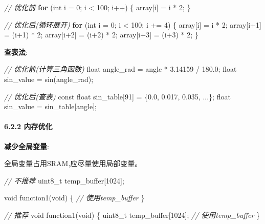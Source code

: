 \documentclass[
]{article}
\newenvironment{Shaded}{}{}
\newcommand{\CommentTok}[1]{\textcolor[rgb]{0.38,0.63,0.69}{\textit{#1}}}
\newcommand{\ControlFlowTok}[1]{\textcolor[rgb]{0.00,0.44,0.13}{\textbf{#1}}}
\newcommand{\DataTypeTok}[1]{\textcolor[rgb]{0.56,0.13,0.00}{#1}}
\newcommand{\DecValTok}[1]{\textcolor[rgb]{0.25,0.63,0.44}{#1}}
\newcommand{\FloatTok}[1]{\textcolor[rgb]{0.25,0.63,0.44}{#1}}
\newcommand{\NormalTok}[1]{#1}
\begin{document}
\begin{Shaded}
\begin{Highlighting}[]
\CommentTok{// 优化前}
\ControlFlowTok{for}\NormalTok{ (}\DataTypeTok{int}\NormalTok{ i = }\DecValTok{0}\NormalTok{; i \textless{} }\DecValTok{100}\NormalTok{; i++) \{}
\NormalTok{    array[i] = i * }\DecValTok{2}\NormalTok{;}
\NormalTok{\}}

\CommentTok{// 优化后(循环展开)}
\ControlFlowTok{for}\NormalTok{ (}\DataTypeTok{int}\NormalTok{ i = }\DecValTok{0}\NormalTok{; i \textless{} }\DecValTok{100}\NormalTok{; i += }\DecValTok{4}\NormalTok{) \{}
\NormalTok{    array[i] = i * }\DecValTok{2}\NormalTok{;}
\NormalTok{    array[i+}\DecValTok{1}\NormalTok{] = (i+}\DecValTok{1}\NormalTok{) * }\DecValTok{2}\NormalTok{;}
\NormalTok{    array[i+}\DecValTok{2}\NormalTok{] = (i+}\DecValTok{2}\NormalTok{) * }\DecValTok{2}\NormalTok{;}
\NormalTok{    array[i+}\DecValTok{3}\NormalTok{] = (i+}\DecValTok{3}\NormalTok{) * }\DecValTok{2}\NormalTok{;}
\NormalTok{\}}
\end{Highlighting}
\end{Shaded}

\textbf{查表法}:

\begin{Shaded}
\begin{Highlighting}[]
\CommentTok{// 优化前(计算三角函数)}
\DataTypeTok{float}\NormalTok{ angle\_rad = angle * }\FloatTok{3.14159}\NormalTok{ / }\FloatTok{180.0}\NormalTok{;}
\DataTypeTok{float}\NormalTok{ sin\_value = sin(angle\_rad);}

\CommentTok{// 优化后(查表)}
\DataTypeTok{const} \DataTypeTok{float}\NormalTok{ sin\_table[}\DecValTok{91}\NormalTok{] = \{}\FloatTok{0.0}\NormalTok{, }\FloatTok{0.017}\NormalTok{, }\FloatTok{0.035}\NormalTok{, ...\};}
\DataTypeTok{float}\NormalTok{ sin\_value = sin\_table[angle];}
\end{Highlighting}
\end{Shaded}

\hypertarget{ux5185ux5b58ux4f18ux5316}{%
\paragraph{6.2.2 内存优化}\label{ux5185ux5b58ux4f18ux5316}}

\textbf{减少全局变量}:

全局变量占用SRAM,应尽量使用局部变量。

\begin{Shaded}
\begin{Highlighting}[]
\CommentTok{// 不推荐}
\DataTypeTok{uint8\_t}\NormalTok{ temp\_buffer[}\DecValTok{1024}\NormalTok{];}

\DataTypeTok{void}\NormalTok{ function1(}\DataTypeTok{void}\NormalTok{)}
\NormalTok{\{}
    \CommentTok{// 使用temp\_buffer}
\NormalTok{\}}

\CommentTok{// 推荐}
\DataTypeTok{void}\NormalTok{ function1(}\DataTypeTok{void}\NormalTok{)}
\NormalTok{\{}
    \DataTypeTok{uint8\_t}\NormalTok{ temp\_buffer[}\DecValTok{1024}\NormalTok{];}
    \CommentTok{// 使用temp\_buffer}
\NormalTok{\}}
\end{Highlighting}
\end{Shaded}
\end{document}
